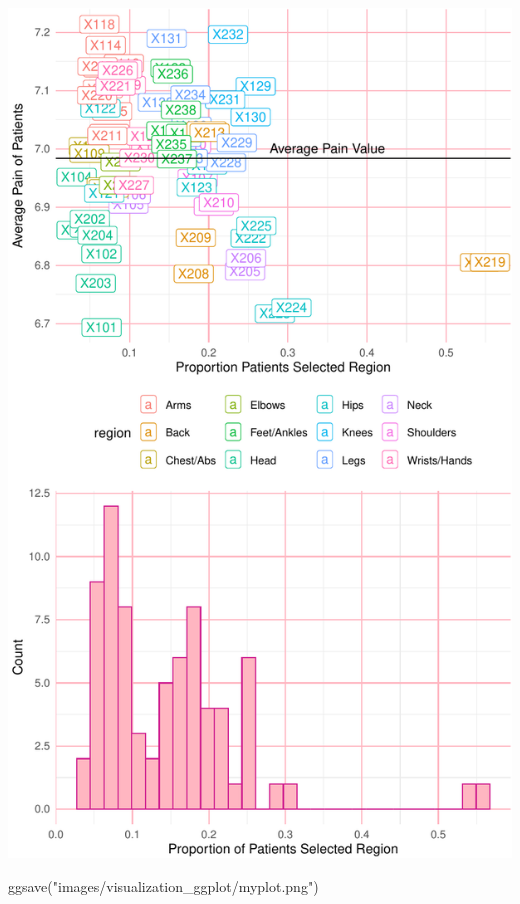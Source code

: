 \documentclass[
  letterpaper,
]{krantz}
\makeatletter
\newenvironment{Shaded}{\begin{snugshade}}{\end{snugshade}}
\newcommand{\FunctionTok}[1]{\textcolor[rgb]{0.28,0.35,0.67}{#1}}
\newcommand{\NormalTok}[1]{\textcolor[rgb]{0.00,0.23,0.31}{#1}}
\newcommand{\StringTok}[1]{\textcolor[rgb]{0.13,0.47,0.30}{#1}}
\newenvironment{kframe}{%
\medskip{}
\setlength{\fboxsep}{.8em}
 \def\at@end@of@kframe{}%
 \ifinner\ifhmode%
  \def\at@end@of@kframe{\end{minipage}}%
  \begin{minipage}{\columnwidth}%
 \fi\fi%
 \def\FrameCommand##1{\hskip\@totalleftmargin \hskip-\fboxsep
 \colorbox{shadecolor}{##1}\hskip-\fboxsep
     \hskip-\linewidth \hskip-\@totalleftmargin \hskip\columnwidth}%
 \MakeFramed {\advance\hsize-\width
   \@totalleftmargin\z@ \linewidth\hsize
   \@setminipage}}%
 {\par\unskip\endMakeFramed%
 \at@end@of@kframe}
\renewenvironment{Shaded}{\begin{kframe}}{\end{kframe}}
\makeatother
\begin{document}
\begin{center}
\includegraphics[width=1\textwidth,height=\textheight]{book/visualization_ggplot_files/figure-pdf/unnamed-chunk-24-1.pdf}
\end{center}

\begin{Shaded}
\begin{Highlighting}[]
\FunctionTok{ggsave}\NormalTok{(}\StringTok{"images/visualization\_ggplot/myplot.png"}\NormalTok{) }
\end{Highlighting}
\end{Shaded}
\end{document}
